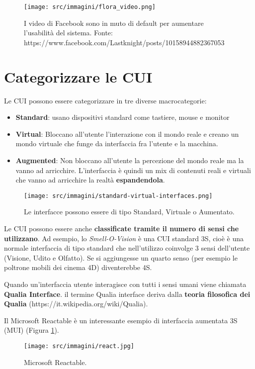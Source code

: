 
\begin{figure}[!h]
	\centering
	\texttt{[image: src/immagini/flora\_video.png]}
	\caption{I video di Facebook sono in muto di default per aumentare l'usabilità del sistema. Fonte: 
https://www.facebook.com/Lastknight/posts/10158944882367053}
\end{figure}



\section{Categorizzare le CUI}
Le CUI possono essere categorizzare in tre diverse macrocategorie:

\begin{itemize}
	\item \textbf{Standard}: usano dispositivi standard come tastiere, mouse e monitor
	\item \textbf{Virtual}: Bloccano all'utente l'interazione con il mondo reale e creano un mondo virtuale che funge da interfaccia fra l'utente e la macchina.
	\item \textbf{Augmented}: Non bloccano all'utente la percezione del mondo reale ma la vanno ad arricchire. L'interfaccia è quindi un mix di contenuti reali e virtuali che vanno ad arricchire la realtà \textbf{espandendola}.
\end{itemize}

\begin{figure}[!h]
	\centering
	\texttt{[image: src/immagini/standard-virtual-interfaces.png]}
	\caption{Le interfacce possono essere di tipo Standard, Virtuale o Aumentato.}
\end{figure}

Le CUI possono essere anche \textbf{classificate tramite il numero di sensi che utilizzano}. Ad esempio, lo \textit{Smell-O-Vision} è una CUI standard 3S, cioè è una normale interfaccia di tipo standard che nell'utilizzo coinvolge 3 sensi dell'utente (Visione, Udito e Olfatto). Se si aggiungesse un quarto senso (per esempio le poltrone mobili dei cinema 4D) diventerebbe 4S.

Quando un'interfaccia utente interagisce con tutti i sensi umani viene chiamata \textbf{Qualia Interface}. il termine Qualia interface deriva dalla \textbf{teoria filosofica dei Qualia} (https://it.wikipedia.org/wiki/Qualia).

Il Microsoft Reactable è un interessante esempio di interfaccia aumentata 3S (MUI) (Figura \ref{fig:react-table}).

\begin{figure}[!h]
	\centering
	\texttt{[image: src/immagini/react.jpg]}
	\caption{Microsoft Reactable.}
	\label{fig:react-table}
\end{figure}



\pagebreak

